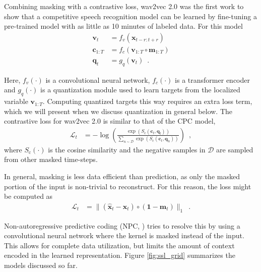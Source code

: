 {Combining masking with a contrastive loss, wav2vec 2.0 was the first work to show that a competitive speech recognition model can be learned by fine-tuning a pre-trained model with as little as 10 minutes of labeled data. For this model
%
\begin{align}
    \mathbf{v}_{t} &= f_v(\mathbf{x}_{t-r:t+r}) \\
    \mathbf{c}_{1:T} &= f_c(\mathbf{v}_{1:T} \circ \mathbf{m}_{1:T}) \\
    \mathbf{q}_t &= g_q(\mathbf{v}_t) \enspace . \label{eq_brief: w2v2 qtz}
\end{align}

\noindent Here, $f_v(\cdot)$ is a convolutional neural network, $f_c(\cdot)$ is a transformer encoder \cite{vaswani_attention_2017} and $g_q(\cdot)$ is a quantization module used to learn targets from the localized variable $\mathbf{v}_{1:T}$. Computing quantized targets this way requires an extra loss term, which we will present when we discuss quantization in general below. The contrastive loss for wav2vec 2.0 is similar to that of the CPC model,
%
\begin{align}
    \mathcal{L}_t &= - \log \left(\frac{\exp(S_{\text{c}}(\mathbf{c}_{t}, \mathbf{q}_{t}))}{\sum_{n \sim \mathcal{D}} \exp(S_{\text{c}}(\mathbf{c}_{t}, \mathbf{q}_{n}))} \right) \enspace , \label{eq_brief: w2v2 loss}
\end{align}
%
\noindent where $S_{\text{c}}(\cdot)$ is the cosine similarity and the negative samples in $\mathcal{D}$ are sampled from other masked time-steps. 

In general, masking is less data efficient than prediction, as only the masked portion of the input is non-trivial to reconstruct. For this reason, the loss might be computed as
%
\begin{align}
    \mathcal{L}_t &= \lVert (\mathbf{\hat{x}}_{t} - \mathbf{x}_{t}) \circ (\mathbf{1} - \mathbf{m}_t) \rVert_1 \enspace .
\end{align}

\noindent Non-autoregressive predictive coding (NPC, \citealp{liu_nonautoregressive_2020}) tries to resolve this by using a convolutional neural network where the kernel is masked instead of the input.
This allows for complete data utilization, but limits the amount of context encoded in the learned representation.
Figure \ref{fig:ssl_grid} summarizes the models discussed so far.

}
